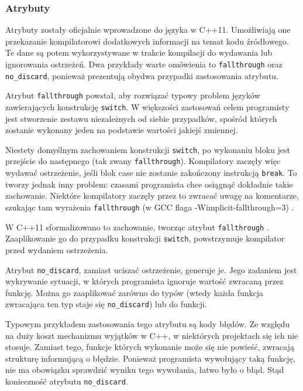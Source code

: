 \subsubsection{Atrybuty}
Atrybuty zostały oficjalnie wprowadzone do języka w C++11\cite{ISO:2012:III}. 
Umożliwiają one przekazanie kompilatorowi dodatkowych informacji na temat kodu źródłowego.
Te dane są potem wykorzystywane w trakcie kompilacji do wydawania lub ignorowania ostrzeżeń.
Dwa przykłady warte omówienia to \lstinline{fallthrough} oraz \lstinline{no_discard}, ponieważ prezentują obydwa przypadki zastosowania atrybutu.

Atrybut \lstinline{fallthrough} powstał, aby rozwiązać typowy problem języków zawierających konstrukcję \lstinline{switch}. W większości zastosowań celem programisty jest stworzenie zestawu niezależnych od siebie przypadków, spośród których zostanie wykonany jeden na podstawie wartości jakiejś zmiennej.\par
Niestety domyślnym zachowaniem konstrukcji \lstinline{switch}, po wykonaniu bloku jest przejście do następnego (tak zwany \lstinline{fallthrough}). Kompilatory zaczęły więc wydawać ostrzeżenie, jeśli blok case nie zostanie zakończony instrukcją \lstinline{break}. To tworzy jednak inny problem: czasami programista chce osiągnąć dokładnie takie zachowanie. Niektóre kompilatory zaczęły przez to zwracać uwagę na komentarze, szukając tam wyrażenia \lstinline{fallthrough} (w GCC flaga -Wimplicit-fallthrough=3) \cite{gcc_warnings}.\par
W C++11 sformalizowano to zachowanie, tworząc atrybut \lstinline{fallthrough} \cite{ISO:2012:III}. Zaaplikowanie go do przypadku konstrukcji \lstinline{switch}, powstrzymuje kompilator przed wydaniem ostrzeżenia.\par
Atrybut \lstinline{no_discard}, zamiast uciszać ostrzeżenie, generuje je. Jego zadaniem jest wykrywanie sytuacji, w których programista ignoruje wartość zwracaną przez funkcję. Można go zaaplikować zarówno do typów (wtedy każda funkcja zwracająca ten typ staje się \lstinline{no_discard}) lub do funkcji.\par
Typowym przykładem zastosowania tego atrybutu są kody błędów. Ze względu na duży koszt mechanizmu wyjątków w C++, w niektórych projektach się ich nie stosuje. Zamiast tego, funkcje których wykonanie może się nie powieść, zwracają strukturę informującą o błędzie. Ponieważ programista wywołujący taką funkcję, nie ma obowiązku sprawdzić wyniku tego wywołania, łatwo było o błąd. Stąd konieczność atrybutu \lstinline{no_discard}.

